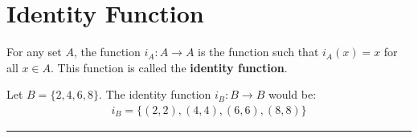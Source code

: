 \documentclass[../notes.tex]{subfiles}
\begin{document}
		\section{Identity Function}
			For any set $A$, the function $i_{A}: A \rightarrow A$ is the function such that $i_{A}(x) = x$ for all $x \in A$. This function is called the \textbf{identity function}.
			\begin{examplebox}
				Let $B = \{2, 4, 6, 8\}$. The identity function $i_{B}: B \rightarrow B$ would be:
					\begin{align*}
						i_{B} = \bigl\{(2, 2), (4, 4), (6, 6), (8, 8)\bigr\}
					\end{align*}
			\end{examplebox}
	\noindent\rule{\textwidth}{0.4pt}
\end{document}
